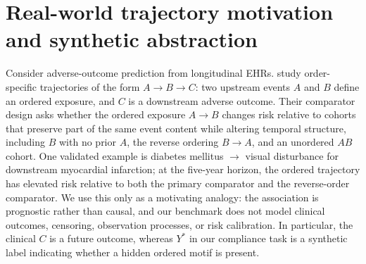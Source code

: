\documentclass[fullpaper]{nldl}
\theoremstyle{plain}
\theoremstyle{definition}
\theoremstyle{remark}
\begin{document}
\begin{table}[tb]
\centering
\caption{Purpose of appendix analyses.}
\end{table}

\section{Real-world trajectory motivation and synthetic abstraction}
\label{app:illustrative}

Consider adverse-outcome prediction from longitudinal EHRs. 
\citet{edelman2026order_specific_ehr} study order-specific trajectories of the form \(A\to B\to C\): two upstream events \(A\) and \(B\) define an ordered exposure, and \(C\) is a downstream adverse outcome. Their comparator design asks whether the ordered exposure \(A\to B\) changes risk relative to cohorts that preserve part of the same event content while altering temporal structure, including \(B\) with no prior \(A\), the reverse ordering \(B\to A\), and an unordered \(AB\) cohort. One validated example is diabetes mellitus \(\to\) visual disturbance for downstream myocardial infarction; at the five-year horizon, the ordered trajectory has elevated risk relative to both the primary comparator and the reverse-order comparator. We use this only as a motivating analogy: the association is prognostic rather than causal, and our benchmark does not model clinical outcomes, censoring, observation processes, or risk calibration. In particular, the clinical \(C\) is a future outcome, whereas \(Y^*\) in our compliance task is a synthetic label indicating whether a hidden ordered motif is present.
\end{document}
